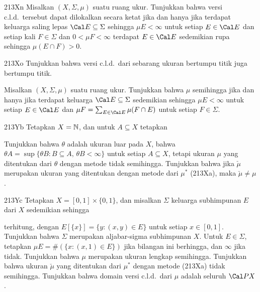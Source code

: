 {\spheader 213Xn Misalkan $(X,\Sigma,\mu)$ suatu ruang ukur.   Tunjukkan bahwa
versi c.l.d.\ tersebut dapat dilokalkan secara ketat jika dan hanya jika terdapat
keluarga saling lepas
$\Cal E\subseteq\Sigma$ sehingga $\mu E<\infty$ untuk setiap $E\in\Cal E$
dan setiap kali $F\in\Sigma$ dan $0<\mu F<\infty$ terdapat $E\in\Cal E$
sedemikian rupa sehingga $\mu(E\cap F)>0$.

\spheader 213Xo Tunjukkan bahwa versi c.l.d.\ dari sebarang ukuran bertumpu
titik juga bertumpu titik.

Misalkan $(X,\Sigma,\mu)$ suatu ruang ukur.   Tunjukkan bahwa $\mu$
semihingga jika dan hanya jika terdapat keluarga $\Cal E\subseteq\Sigma$
sedemikian sehingga
$\mu E<\infty$ untuk setiap $E\in\Cal E$ dan
$\mu F=\sum_{E\in\Cal E}\mu(F\cap E)$ untuk setiap $F\in\Sigma$.

\spheader 213Yb
Tetapkan $X=\Bbb N$, dan untuk $A\subseteq X$ tetapkan


\noindent Tunjukkan bahwa $\theta$ adalah ukuran luar pada $X$, bahwa
$\theta A=\sup\{\theta B:B\subseteq A,\,\theta B<\infty\}$ untuk setiap
$A\subseteq X$, tetapi ukuran $\mu$ yang ditentukan dari $\theta$ dengan
metode \Caratheodory tidak semihingga.   Tunjukkan bahwa jika $\check\mu$
merupakan ukuran yang ditentukan dengan metode \Caratheodory dari $\mu^*$
(213Xa), maka
$\check\mu\ne\mu$.

\spheader 213Yc Tetapkan $X=[0,1]\times\{0,1\}$, dan misalkan $\Sigma$
keluarga subhimpunan $E$ dari $X$ sedemikian sehingga


\noindent terhitung, dengan $E[\{x\}]=\{y:(x,y)\in E\}$ untuk setiap
$x\in[0,1]$.   Tunjukkan bahwa $\Sigma$ merupakan aljabar-sigma
subhimpunan $X$.   Untuk $E\in\Sigma$, tetapkan
$\mu E=\#(\{x:(x,1)\in E\})$ jika bilangan ini berhingga, dan $\infty$ jika
tidak.   Tunjukkan bahwa $\mu$ merupakan ukuran lengkap semihingga.   Tunjukkan
bahwa ukuran $\check\mu$ yang ditentukan dari $\mu^*$ dengan metode
\Caratheodory (213Xa) tidak semihingga.   Tunjukkan bahwa domain versi c.l.d.\
dari $\mu$ adalah seluruh $\Cal PX$.

}
